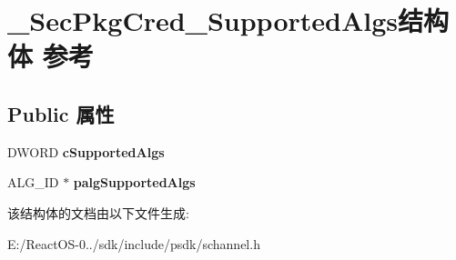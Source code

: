 \hypertarget{struct___sec_pkg_cred___supported_algs}{}\section{\+\_\+\+Sec\+Pkg\+Cred\+\_\+\+Supported\+Algs结构体 参考}
\label{struct___sec_pkg_cred___supported_algs}
\subsection*{Public 属性}
\begin{DoxyCompactItemize}
\item 
\mbox{\label{struct___sec_pkg_cred___supported_algs_ad22bc6ffe45be8f5e8b9f09f434986d0}} 
D\+W\+O\+RD {\bfseries c\+Supported\+Algs}
\item 
\mbox{\label{struct___sec_pkg_cred___supported_algs_a769751b0779c4ad433460533a9f359db}} 
A\+L\+G\+\_\+\+ID $\ast$ {\bfseries palg\+Supported\+Algs}
\end{DoxyCompactItemize}


该结构体的文档由以下文件生成\+:\begin{DoxyCompactItemize}
\item 
E\+:/\+React\+O\+S-\/0../sdk/include/psdk/schannel.\+h\end{DoxyCompactItemize}

